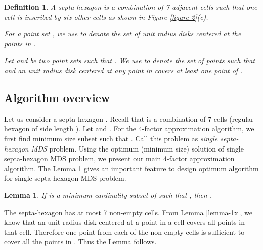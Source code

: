 \documentclass[a4paper,11pt]{article}
\newtheorem{lemma}{Lemma}
\newtheorem{definition}{Definition}
\newenvironment{proof}{\noindent {\bf Proof:\,\ }}{\hfill\mbox{\
}\smallskip}
\begin{document}
\begin{definition}
A {\it septa-hexagon} is a combination of 7 adjacent cells such that one cell is inscribed by six other 
cells as shown in Figure \ref{figure-2}(c). 

For a point set , we use  to denote the set of unit radius disks centered at the points in .

Let  and  be two point sets such that . We use  to denote the set 
of points such that  and an unit radius disk centered at any point in 
 covers at least one point of .
\end{definition}


\subsection{Algorithm overview}
Let us consider a septa-hexagon . Recall that  is a combination of 7 cells (regular 
hexagon of side length ). Let  and . For the 
4-factor approximation algorithm, we first find minimum size subset  such that 
. Call this problem as {\it single septa-hexagon MDS} problem. 
Using the optimum (minimum size) solution of single septa-hexagon MDS problem, we present our main 4-factor 
approximation algorithm. The Lemma \ref{lemma-2x} gives an important feature to design optimum algorithm for
single septa-hexagon MDS problem. 


\begin{lemma} \label{lemma-2x}
 If is a minimum cardinality subset of  such that 
, then .
\end{lemma}

\begin{proof}
The septa-hexagon  has at most 7 non-empty cells. From Lemma \ref{lemma-1x}, we know that 
an unit radius disk centered at a point in a cell covers all points in that cell. Therefore one point 
from each of the non-empty cells is sufficient to cover all the points in . Thus the 
Lemma follows. 
\end{proof}
\end{document}
